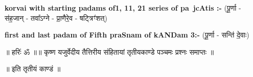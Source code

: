 \documentclass[17pt]{extarticle}
\begin{document}
        \textbf{korvai with starting padams of1, 11, 21 series of pa~jcAtis :-} \newline
        (पू॒र्णा - स॑ह॒जान् - तवा᳚ऽग्ने - प्रा॒णैरे॒व - षट्त्रिꣳ॑शत्) \newline

        \textbf{first and last padam of Fifth praSnam of kANDam 3:-} \newline
        (पू॒र्णा - सन्ति॑ दे॒वाः) \newline 

        
        ॥ हरिः॑ ॐ ॥॥ कृष्ण यजुर्वेदीय तैत्तिरीय संहितायां तृतीयकाण्डे पञ्चमः प्रश्नः समाप्तः ॥

॥ इति तृतीयं काण्डं ॥ \newline
        \pagebreak
                \pagebreak
        
\end{document}
